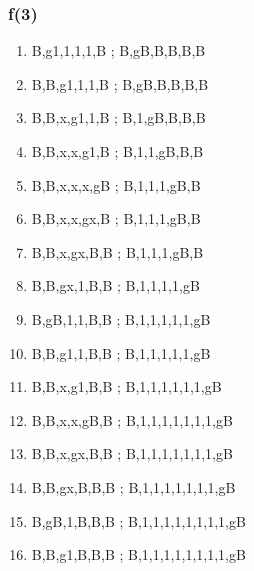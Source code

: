 \documentclass[leqno]{article}
\begin{document}
            \subsubsection{f(3)}
                \begin{enumerate}
                    \item {}            {B,g1,1,1,1,B ; B,gB,B,B,B,B}
                    \item {}             {B,B,g1,1,1,B ; B,gB,B,B,B,B}
                    \item {}            {B,B,x,g1,1,B ; B,1,gB,B,B,B}
                    \item {}           {B,B,x,x,g1,B ; B,1,1,gB,B,B}
                    \item {}         {B,B,x,x,x,gB ; B,1,1,1,gB,B}
                    \item {}          {B,B,x,x,gx,B ; B,1,1,1,gB,B}
                    \item {}           {B,B,x,gx,B,B ; B,1,1,1,gB,B}
                    \item {}          {B,B,gx,1,B,B ; B,1,1,1,1,gB}
                    \item {}        {B,gB,1,1,B,B ; B,1,1,1,1,1,gB}
                    \item {}         {B,B,g1,1,B,B ; B,1,1,1,1,1,gB}
                    \item {}     {B,B,x,g1,B,B ; B,1,1,1,1,1,1,gB}
                    \item {}   {B,B,x,x,gB,B ; B,1,1,1,1,1,1,1,gB}
                    \item {}    {B,B,x,gx,B,B ; B,1,1,1,1,1,1,1,gB}
                    \item {}     {B,B,gx,B,B,B ; B,1,1,1,1,1,1,1,gB}
                    \item {}   {B,gB,1,B,B,B ; B,1,1,1,1,1,1,1,1,gB}
                    \item {}    {B,B,g1,B,B,B ; B,1,1,1,1,1,1,1,1,gB}

\end{enumerate}
\end{document}

